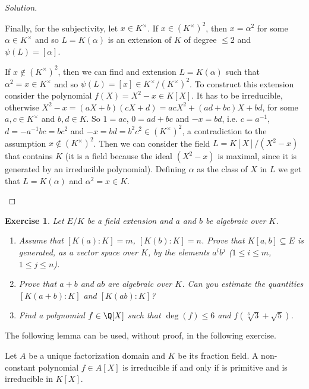 \documentclass[a4paper,10pt,reqno]{amsart}
\newtheorem{ex}{Exercise}[section]
\newenvironment{sol}
  {\renewcommand\qedsymbol{$\blacksquare$}\begin{proof}[Solution]}
  {\end{proof}}
\begin{document}
\begin{sol}
\begin{enumerate}[label=(\roman*)]
        Finally, for the subjectivity, let $x\in K^\times$.
        If $x\in (K^\times)^2$, then $x=\alpha^2$ for some $\alpha\in K^\times$
        and so $L=K(\alpha)$ is an extension of $K$ of degree $\leq 2$ 
        and $\psi(L)=[\alpha]$.

        If $x\not\in (K^\times)^2$, then we can find and extension $L=K(\alpha)$ such that
        $\alpha^2=x\in K^\times$ and so $\psi(L)=[x]\in K^\times/(K^\times)^2$.
        To construct this extension consider the polynomial $f(X)=X^2-x\in K[X]$.
        It has to be irreducible, otherwise $X^2-x=(aX+b)(cX+d)=acX^2+(ad+bc)X+bd$, for some
        $a,c\in K^\times$ and $b,d\in K$.
        So $1=ac$, $0=ad+bc$ and $-x=bd$, i.e. $c=a^{-1}$, $d=-a^{-1}bc=bc^2$ and $-x=bd=b^2c^2\in (K^\times)^2$, a contradiction to the assumption $x\not\in (K^\times)^2$.
        Then we can consider the field $L=K[X]/(X^2-x)$ that contains $K$
        (it is a field because the ideal $(X^2-x)$ is maximal,
        since it is generated by an irreducible polynomial).
        Defining $\alpha$ as the class of $X$ in $L$ 
        we get that $L=K(\alpha)$ and $\alpha^2=x\in K$.\qedhere
    \end{enumerate}    
\end{sol}

\begin{ex}\label{2.2}
    Let $E/K$ be a field extension and 
    $a$ and $b$ be algebraic over $K$.

    \begin{enumerate}
        \item Assume that $[K(a):K] = m$, $[K(b):K] = n$. Prove that $K[a,b] \subseteq E$ is generated, as a vector space over $K$, by the elements $a^ib^j$ ($1 \leq i \leq m$, $1 \leq j \leq n$).
        \item Prove that $a+b$ and $ab$ are algebraic over $K$. Can you estimate the quantities $[K(a+b):K]$ and $[K(ab):K]$?
        \item Find a polynomial $f \in \Q[X]$ such that $\deg(f) \leq 6$ and $f(\sqrt[3]{3} + \sqrt{5})$.
    \end{enumerate}
\end{ex}

The following lemma can be used, without proof, in the following exercise.

\begin{lem*}
    Let $A$ be a unique factorization domain and $K$ be its fraction field.
    A non-constant polynomial $f\in A[X]$ is irreducible if and only if is primitive and is irreducible in $K[X]$.
\end{lem*}
\end{document}
